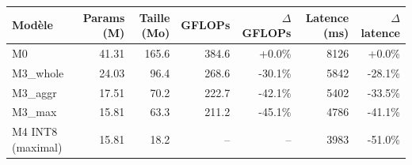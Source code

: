 \begin{tabular}{@{}lrrrrrr@{}}
\toprule
Mod\`ele & Params (M) & Taille (Mo) & GFLOPs & $\Delta$GFLOPs & Latence (ms) & $\Delta$latence \\
\midrule
M0 & 41.31 & 165.6 & 384.6 & +0.0\% & 8126 & +0.0\% \\
M3\_whole & 24.03 & 96.4 & 268.6 & -30.1\% & 5842 & -28.1\% \\
M3\_aggr & 17.51 & 70.2 & 222.7 & -42.1\% & 5402 & -33.5\% \\
M3\_max & 15.81 & 63.3 & 211.2 & -45.1\% & 4786 & -41.1\% \\
M4 INT8 (maximal) & 15.81 & 18.2 & -- & -- & 3983 & -51.0\% \\
\bottomrule
\end{tabular}